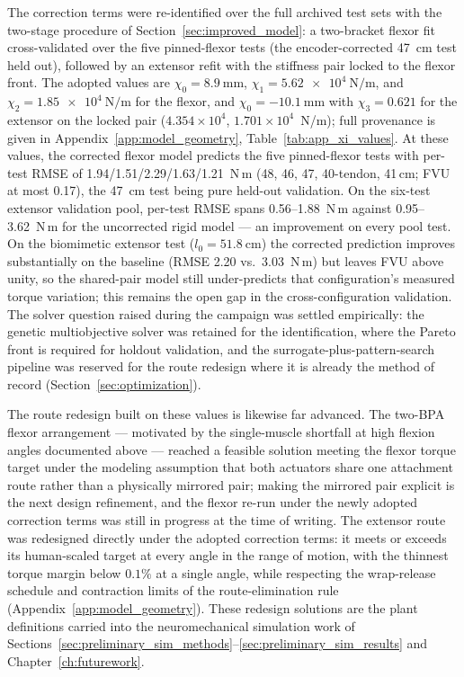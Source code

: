The correction terms were re-identified over the full archived test sets with the two-stage procedure of Section~\ref{sec:improved_model}: a two-bracket flexor fit cross-validated over the five pinned-flexor tests (the encoder-corrected \qty{47}{\cm} test held out), followed by an extensor refit with the stiffness pair locked to the flexor front. The adopted values are $\chi_{0} = \qty{+8.9}{\mm}$, $\chi_{1} = \qty{5.62e4}{\N\per\m}$, and $\chi_{2} = \qty{1.85e4}{\N\per\m}$ for the flexor, and $\chi_{0} = \qty{-10.1}{\mm}$ with $\chi_{3} = 0.621$ for the extensor on the locked pair ($4.354\times10^{4}$, $1.701\times10^{4}$~N/m); full provenance is given in Appendix~\ref{app:model_geometry}, Table~\ref{tab:app_xi_values}. At these values, the corrected flexor model predicts the five pinned-flexor tests with per-test RMSE of 1.94/1.51/2.29/1.63/1.21~N{\,}m (48, 46, 47, 40-tendon, 41\,cm; FVU at most 0.17), the \qty{47}{\cm} test being pure held-out validation. On the six-test extensor validation pool, per-test RMSE spans 0.56--1.88~N{\,}m against 0.95--3.62~N{\,}m for the uncorrected rigid model --- an improvement on every pool test. On the biomimetic extensor test ($l_{0} = \qty{51.8}{\cm}$) the corrected prediction improves substantially on the baseline (RMSE 2.20 vs.\ 3.03~N{\,}m) but leaves FVU above unity, so the shared-pair model still under-predicts that configuration's measured torque variation; this remains the open gap in the cross-configuration validation. The solver question raised during the campaign was settled empirically: the genetic multiobjective solver was retained for the identification, where the Pareto front is required for holdout validation, and the surrogate-plus-pattern-search pipeline was reserved for the route redesign where it is already the method of record (Section~\ref{sec:optimization}).

The route redesign built on these values is likewise far advanced. The two-BPA flexor arrangement --- motivated by the single-muscle shortfall at high flexion angles documented above --- reached a feasible solution meeting the flexor torque target under the modeling assumption that both actuators share one attachment route rather than a physically mirrored pair; making the mirrored pair explicit is the next design refinement, and the flexor re-run under the newly adopted correction terms was still in progress at the time of writing. The extensor route was redesigned directly under the adopted correction terms: it meets or exceeds its human-scaled target at every angle in the range of motion, with the thinnest torque margin below $0.1\%$ at a single angle, while respecting the wrap-release schedule and contraction limits of the route-elimination rule (Appendix~\ref{app:model_geometry}). These redesign solutions are the plant definitions carried into the neuromechanical simulation work of Sections~\ref{sec:preliminary_sim_methods}--\ref{sec:preliminary_sim_results} and Chapter~\ref{ch:futurework}.


